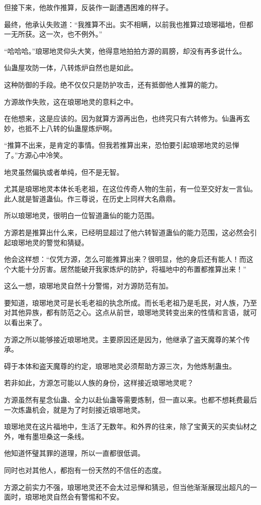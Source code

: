 \begin{this_body}
但接下来，他故作推算，反装作一副遭遇困难的样子。

最终，他承认失败道：“我推算不出。实不相瞒，以前我也推算过琅琊福地，但都一无所获。这一次，也不例外。”

“哈哈哈。”琅琊地灵仰头大笑，他得意地拍拍方源的肩膀，却没有再多说什么。

仙蛊屋攻防一体，八转炼炉自然也是如此。

这种防御的手段。绝不仅仅只是防护攻击，还有抵御他人推算的能力。

方源故作失败，这在琅琊地灵的意料之中。

在他想来，这是应该的。因为就算方源再出色，也终究只有六转修为。仙蛊再玄妙，也抵不上八转的仙蛊屋炼炉啊。

“推算不出来，是肯定的事情。但我若推算出来，恐怕要引起琅琊地灵的忌惮了。”方源心中冷笑。

地灵虽然偏执或者单纯，但不是无智。

尤其是琅琊地灵本体长毛老祖，在这位传奇人物的生前，有一位至交好友一言仙。此人就是智道蛊仙。作三尊说，在历史上同样大名鼎鼎。

所以琅琊地灵，很明白一位智道蛊仙的能力范围。

方源若是推算出什么来，已经明显超过了他六转智道蛊仙的能力范围，这必然会引起琅琊地灵的警觉和猜疑。

他会这样想：“仅凭方源，怎么可能推算出来？很明显，他的身后还有能人！而这个大能十分厉害。居然能破开我家炼炉的防护，将福地中的布置都推算出来！”

这么一想，琅琊地灵自然十分警惕，对方源防范有加。

要知道，琅琊地灵可是长毛老祖的执念所成。而长毛老祖乃是毛民，对人族，乃至对其他异族，都有防范之心。这点从前世，琅琊地灵转变出来的性情和言语，就可以看出来了。

方源之所以能够接近琅琊地灵。主要原因还是因为，他继承了盗天魔尊的某个传承。

碍于本体和盗天魔尊的约定，琅琊地灵必须帮助方源三次，为他炼制蛊虫。

若非如此，方源怎可能以人族的身份，这样接近琅琊地灵呢？

方源虽然有星念仙蛊、全力以赴仙蛊等需要炼制，但一直以来。也都不想耗费最后一次炼蛊机会，就是为了时刻接近琅琊地灵。

琅琊地灵在这片福地中，生活了无数年。和外界的往来，除了宝黄天的买卖仙材之外，唯有墨坦桑这一条线。

他知道怀璧其罪的道理，所以一直都很低调。

同时也对其他人，都抱有一份天然的不信任的态度。

方源之前实力不强，琅琊地灵还不会太过忌惮和猜忌，但当他渐渐展现出超凡的一面时，琅琊地灵自然会有警惕和不安。


\end{this_body}
